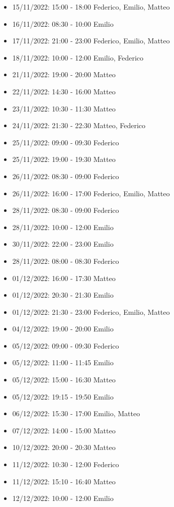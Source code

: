 \begin{itemize}
    \item 15/11/2022: 15:00 - 18:00 Federico, Emilio, Matteo
    \item 16/11/2022: 08:30 - 10:00 Emilio
    \item 17/11/2022: 21:00 - 23:00 Federico, Emilio, Matteo
    \item 18/11/2022: 10:00 - 12:00 Emilio, Federico
    \item 21/11/2022: 19:00 - 20:00 Matteo
    \item 22/11/2022: 14:30 - 16:00 Matteo
    \item 23/11/2022: 10:30 - 11:30 Matteo
    \item 24/11/2022: 21:30 - 22:30 Matteo, Federico
    \item 25/11/2022: 09:00 - 09:30 Federico
    \item 25/11/2022: 19:00 - 19:30 Matteo
    \item 26/11/2022: 08:30 - 09:00 Federico
    \item 26/11/2022: 16:00 - 17:00 Federico, Emilio, Matteo
    \item 28/11/2022: 08:30 - 09:00 Federico
    \item 28/11/2022: 10:00 - 12:00 Emilio
    \item 30/11/2022: 22:00 - 23:00 Emilio
    \item 28/11/2022: 08:00 - 08:30 Federico
    \item 01/12/2022: 16:00 - 17:30 Matteo
    \item 01/12/2022: 20:30 - 21:30 Emilio
    \item 01/12/2022: 21:30 - 23:00 Federico, Emilio, Matteo
    \item 04/12/2022: 19:00 - 20:00 Emilio
    \item 05/12/2022: 09:00 - 09:30 Federico
    \item 05/12/2022: 11:00 - 11:45 Emilio
    \item 05/12/2022: 15:00 - 16:30 Matteo
    \item 05/12/2022: 19:15 - 19:50 Emilio
    \item 06/12/2022: 15:30 - 17:00 Emilio, Matteo
    \item 07/12/2022: 14:00 - 15:00 Matteo
    \item 10/12/2022: 20:00 - 20:30 Matteo
    \item 11/12/2022: 10:30 - 12:00 Federico
    \item 11/12/2022: 15:10 - 16:40 Matteo
    \item 12/12/2022: 10:00 - 12:00 Emilio

\end{itemize}

